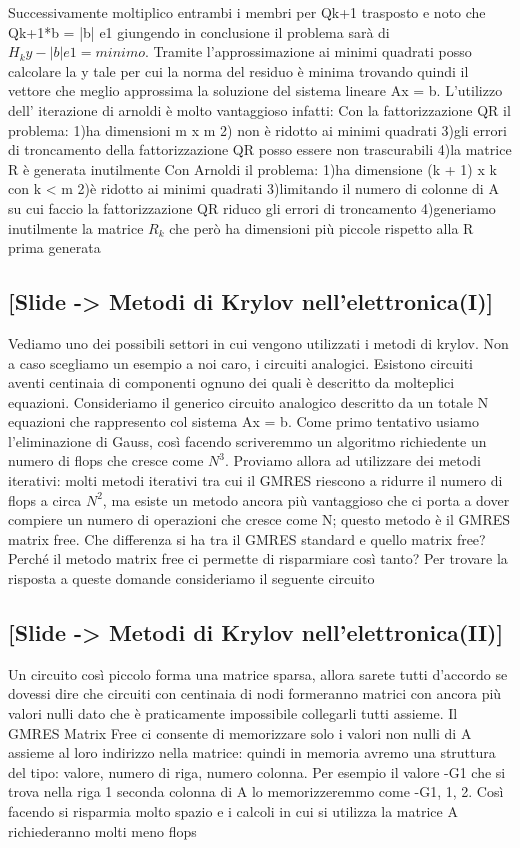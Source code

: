 \documentclass[a4paper]{article}
\begin{document}
Successivamente moltiplico entrambi i membri per Qk+1 trasposto e noto che Qk+1*b = |b| e1 giungendo in conclusione il problema sarà di $H_k y - |b|e1 = minimo$. 
Tramite l’approssimazione ai minimi quadrati posso calcolare la y tale per cui la norma del residuo è minima trovando quindi il vettore che meglio approssima la soluzione del sistema lineare Ax = b.
L’utilizzo dell’ iterazione di arnoldi è molto vantaggioso infatti:
Con la fattorizzazione QR il problema:
1)ha dimensioni m x m
2) non è ridotto ai minimi quadrati
3)gli errori di troncamento della fattorizzazione QR posso essere non trascurabili
4)la matrice R è generata inutilmente
Con Arnoldi il problema:
1)ha dimensione (k + 1) x k con k < m
2)è ridotto ai minimi quadrati
3)limitando il numero di colonne di A su cui faccio la fattorizzazione QR riduco gli errori di troncamento
4)generiamo inutilmente la matrice $R_k$ che però ha dimensioni più piccole rispetto alla R prima generata

\subsection*{[Slide -> Metodi di Krylov nell'elettronica(I)]}
Vediamo uno dei possibili settori in cui vengono utilizzati i metodi di krylov. Non a caso scegliamo un esempio a noi caro, i circuiti analogici. 
Esistono circuiti aventi centinaia di componenti ognuno dei quali è descritto da molteplici equazioni.
Consideriamo il generico circuito analogico descritto da un totale N equazioni che rappresento col sistema Ax = b.
Come primo tentativo usiamo l’eliminazione di Gauss, così facendo scriveremmo un algoritmo richiedente un numero di flops che cresce come $N^3$. Proviamo allora ad utilizzare dei metodi iterativi:
molti metodi iterativi tra cui il GMRES riescono a ridurre il numero di flops a circa $N^2$, ma esiste un metodo ancora più vantaggioso che ci porta a dover compiere un numero di operazioni che cresce come N; questo metodo è il GMRES matrix free.
Che differenza si ha tra il GMRES standard e quello matrix free? Perché il metodo matrix free ci permette di risparmiare così tanto?
Per trovare la risposta a queste domande consideriamo il seguente circuito

\subsection*{[Slide -> Metodi di Krylov nell'elettronica(II)]}
Un circuito così piccolo forma una matrice sparsa, allora sarete tutti d’accordo se dovessi dire che circuiti con centinaia di nodi formeranno matrici con ancora più valori nulli dato che è praticamente impossibile collegarli tutti assieme. Il GMRES Matrix Free ci consente di memorizzare solo i valori non nulli di A assieme al loro indirizzo nella matrice: quindi in memoria avremo una struttura del tipo: valore, numero di riga, numero colonna.
 Per esempio il valore -G1 che si trova nella riga 1 seconda colonna di A lo memorizzeremmo come -G1, 1, 2.
Così facendo si risparmia molto spazio e i calcoli in cui si utilizza la matrice A richiederanno molti meno flops
\end{document}
